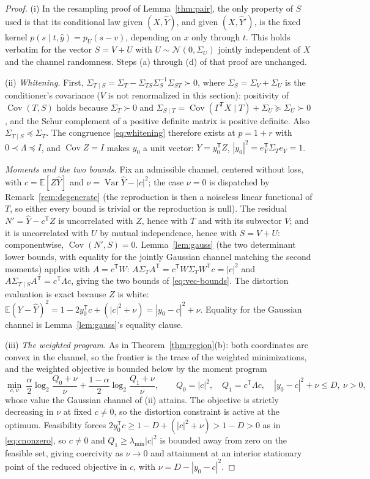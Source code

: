 \documentclass[11pt,onecolumn]{IEEEtran}
\newcommand{\E}{\mathbb{E}}
\newcommand{\Cov}{\operatorname{Cov}}
\newcommand{\hY}{\widehat{Y}}
\begin{document}
\begin{proof}
(i) In the resampling proof of Lemma~\ref{thm:pair}, the only
property of $S$ used is that its conditional law given $(X,\hY)$, and
given $(X,\hY')$, is the fixed kernel
$p(s\mid t,\hat y)=p_U(s-v)$, depending on $x$ only through $t$. This
holds verbatim for the vector $S=V+U$ with
$U\sim\mathcal N(0,\Sigma_U)$ jointly independent of $X$ and the
channel randomness. Steps (a) through (d) of that proof are unchanged.

(ii) \emph{Whitening.} First,
$\Sigma_{T\mid S}=\Sigma_T-\Sigma_{TS}\Sigma_S^{-1}\Sigma_{ST}\succ0$,
where $\Sigma_S=\Sigma_V+\Sigma_U$ is the conditioner's covariance
($V$ is not renormalized in this section):
positivity of $\Cov(T,S)$ holds because $\Sigma_T\succ0$ and
$\Sigma_{S\mid T}=\Cov(\Gamma^{\mathsf T}X\mid T)+\Sigma_U\succeq
\Sigma_U\succ0$, and the Schur complement of a positive definite
matrix is positive definite. Also $\Sigma_{T\mid S}\preceq\Sigma_T$.
The congruence \eqref{eq:whitening} therefore exists at $p=1+r$ with
$0\prec\Lambda\preceq I$, and $\Cov Z=I$ makes $y_0$ a unit vector:
$Y=y_0^{\mathsf T}Z$, $|y_0|^2=e_Y^{\mathsf T}\Sigma_Te_Y=1$.

\emph{Moments and the two bounds.} Fix an admissible channel, centered
without loss, with $c=\E[Z\hY]$ and
$\nu=\operatorname{Var}\hY-|c|^2$; the case $\nu=0$ is dispatched by
Remark~\ref{rem:degenerate} (the reproduction is then a noiseless
linear functional of $T$, so either every bound is trivial or the
reproduction is null). The residual $N'=\hY-c^{\mathsf T}Z$ is
uncorrelated with $Z$, hence with $T$ and with its subvector $V$; and
it is uncorrelated with $U$ by mutual independence, hence with
$S=V+U$: componentwise, $\Cov(N',S)=0$. Lemma~\ref{lem:gauss} (the two
determinant lower bounds, with equality for the jointly Gaussian
channel matching the second moments) applies with $A=c^{\mathsf T}W$:
$A\Sigma_TA^{\mathsf T}=c^{\mathsf T}W\Sigma_TW^{\mathsf T}c=|c|^2$
and
$A\Sigma_{T\mid S}A^{\mathsf T}=c^{\mathsf T}\Lambda c$, giving the
two bounds of \eqref{eq:vec-bounds}. The distortion evaluation is
exact because $Z$ is white:
$\E(Y-\hY)^2=1-2y_0^{\mathsf T}c+(|c|^2+\nu)=|y_0-c|^2+\nu$. Equality for
the Gaussian channel is Lemma~\ref{lem:gauss}'s equality clause.

(iii) \emph{The weighted program.} As in
Theorem~\ref{thm:region}(b): both coordinates are convex in the channel,
so the frontier is the trace of the weighted minimizations, and the
weighted objective is bounded below by the moment program
\[
\min_{c,\nu}\
\frac\alpha2\log_2\frac{Q_0+\nu}{\nu}
+\frac{1-\alpha}2\log_2\frac{Q_1+\nu}{\nu},
\qquad
Q_0=|c|^2,\quad
Q_1=c^{\mathsf T}\Lambda c,\quad
|y_0-c|^2+\nu\le D,\ \nu>0,
\]
whose value the Gaussian channel of (ii) attains. The objective is
strictly decreasing in $\nu$ at fixed $c\ne0$, so the distortion
constraint is active at the optimum. Feasibility forces
$2y_0^{\mathsf T}c\ge1-D+(|c|^2+\nu)>1-D>0$ as in \eqref{eq:cnonzero}, so
$c\ne0$ and $Q_1\ge\lambda_{\min}|c|^2$ is bounded away from zero on
the feasible set, giving coercivity as $\nu\to0$ and attainment at an
interior stationary point of the reduced objective in $c$, with
$\nu=D-|y_0-c|^2$.


\end{proof}
\end{document}
